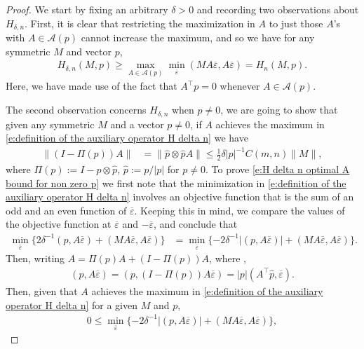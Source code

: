 \documentclass[10pt,a4paper]{amsart}
\begin{document}
\begin{proof} We start by fixing an arbitrary $\delta>0$ and recording two observations about $H_{\delta,n}$. First, it is clear that restricting the maximization in $A$ to just those $A$'s with $A\in \mathcal{A}(p)$ cannot increase the maximum, and so we have for any symmetric $M$ and vector $p$,
\begin{align}\label{e:H delta n basic lower pointwise bound}
  H_{\delta,n}(M,p) \geq \max_{A\in\mathcal{A}(p)}\min_{\overline\varepsilon}(MA\overline\varepsilon,A\overline\varepsilon) = H_n(M,p).    
\end{align}
Here, we have made use of the fact that $A^\top p = 0$ whenever $A \in \mathcal{A}(p)$. 

The second observation concerns $H_{\delta,n}$ when $p\neq 0$, we are going to show that given any symmetric $M$ and a vector $p\neq 0$, if $A$ achieves the maximum in \eqref{e:definition of the auxiliary operator H delta n} we have 
\begin{align}\label{e:H delta n optimal A bound for non zero p}
  \|(I-\Pi(p))A\| & = 
\|\hat p \otimes \hat p A\| \leq \tfrac{1}{2}\delta |p|^{-1} C(m,n)\|M\|,  
\end{align}
where $\Pi(p) := I-\hat p\otimes \hat p$, $\hat p := p/|p|$ for $p\neq 0$. To prove \eqref{e:H delta n optimal A bound for non zero p} we first note that the minimization in \eqref{e:definition of the auxiliary operator H delta n} involves an objective function that is the sum of an odd and an even function of $\overline \varepsilon$. Keeping this in mind, we compare the values of the objective function at $\overline\varepsilon$ and $-\overline \varepsilon$, and conclude that
\begin{align}
  \min_{\overline\varepsilon}\{2\delta^{-1}(p,A\overline \varepsilon)+ (MA\overline \varepsilon,A\overline \varepsilon)\} & =   \min_{\overline\varepsilon}\{ -2\delta^{-1}|(p,A\overline \varepsilon)|+ (MA\overline \varepsilon,A\overline \varepsilon)\}. \label{e:odd_even_relationship}
\end{align}
Then, writing $A = \Pi(p)A+(I-\Pi(p))A$, where , 
\begin{align*}
  (p,A\overline \varepsilon) = (p,(I-\Pi(p))A\overline \varepsilon) =  |p|(A^\top \hat p,\overline\varepsilon). 
\end{align*}
Then, given that $A$ achieves the maximum  in \eqref{e:definition of the auxiliary operator H delta n} for a given $M$ and $p$,  
\begin{align*}
 0 \leq \min_{\overline \varepsilon}\{ -2\delta^{-1}|(p,A\overline \varepsilon)|+ (MA\overline \varepsilon,A\overline \varepsilon)\},

\end{align*}
\end{proof}
\end{document}
